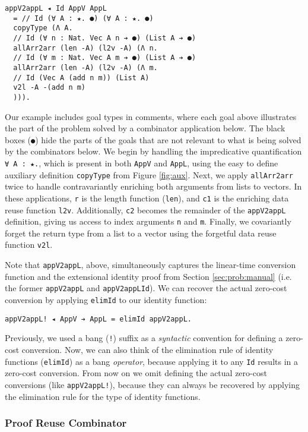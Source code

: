\documentclass[acmsmall]{acmart}\settopmatter{}
\newcommand{\refsec}[1]{Section \ref{sec:#1}}
\newcommand{\reffig}[1]{Figure \ref{fig:#1}}
\begin{document}
\begin{verbatim}
appV2appL ◂ Id AppV AppL
  = // Id (∀ A : ★. ●) (∀ A : ★. ●)
  copyType (Λ A. 
  // Id (∀ n : Nat. Vec A n ➔ ●) (List A ➔ ●)
  allArr2arr (len -A) (l2v -A) (Λ n. 
  // Id (∀ m : Nat. Vec A m ➔ ●) (List A ➔ ●)
  allArr2arr (len -A) (l2v -A) (Λ m. 
  // Id (Vec A (add n m)) (List A)
  v2l -A -(add n m)
  ))).
\end{verbatim}
Our example includes goal types in comments, where each goal above
illustrates the part of the problem solved by a combinator
application below. The black boxes (\verb;●;) hide the parts of the
goals that are not relevant to what is being solved by the combinators
below. We begin by handling the impredicative quantification
\verb;∀ A : ★.;, which is present in both \verb;AppV; and \verb;AppL;,
using the easy to define auxiliary definition \verb;copyType; from
\reffig{aux}. Next, we apply \verb;allArr2arr; twice to handle
contravariantly enriching both arguments from lists to
vectors. In these applications, \verb;r; is the length function
(\verb;len;), and \verb;c1; is the enriching data reuse function
\verb;l2v;. Additionally, \verb;c2; becomes the remainder of the
\verb;appV2appL; definition, giving us access to index arguments
\verb;n; and \verb;m;. Finally, we covariantly forget the return type from a
list to a vector using the forgetful data reuse function \verb;v2l;.

Note that \verb;appV2appL;, above, simultaneously captures the
linear-time conversion function and the extensional identity proof
from \refsec{prob:manual}
(i.e. the former \verb;appV2appL; and \verb;appV2appLId;).
We can recover the actual zero-cost
conversion by applying \verb;elimId; to our identity function:

\begin{verbatim}
appV2appL! ◂ AppV ➔ AppL = elimId appV2appL.
\end{verbatim}
Previously, we used a bang (\verb;!;) suffix as a \textit{syntactic} convention for
defining a zero-cost conversion. Now, we can also think of the elimination
rule of identity functions (\verb;elimId;) as a bang
\textit{operator}, because applying it to any \verb;Id; results in a
zero-cost conversion. From now on we omit defining the actual
zero-cost conversions (like \verb;appV2appL!;), because they can always
be recovered by applying the elimination rule for the type of identity
functions.

\subsubsection{Proof Reuse Combinator}
\end{document}
